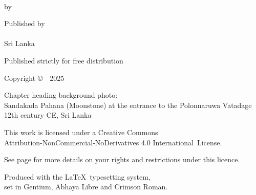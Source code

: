 \cleartoverso
\thispagestyle{empty}

{\copyrightsize
\centering
\setlength{\parindent}{0pt}%
\setlength{\parskip}{0.8\baselineskip}%

\thetitle\\
\thesubtitle

by \theauthor

Published by\\
\thePublisher\\
Sri Lanka

Published strictly for free distribution


Copyright \copyright\ \thePublisher\ 2025

Chapter heading background photo:\\
Sandakada Pahana (Moonstone) at the entrance to the Polonnaruwa Vatadage\\
12th century CE, Sri Lanka

\vfill

{\footnotesize

This work is licensed under a Creative Commons\\
Attribution-NonCommercial-NoDerivatives 4.0 International~License.

See page \pageref{copyright-details} for more details on your rights and restrictions under this licence.

Produced with the \LaTeX\ typesetting system,\\ set in Gentium, Abhaya Libre and Crimson Roman.

\theEditionInfo

}}
